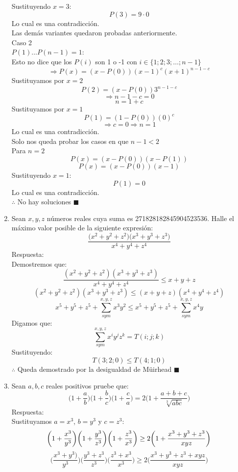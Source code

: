 \documentclass{book}
\begin{document}
\begin{enumerate}
        Sustituyendo $x=3$:
        $$P(3)=9\cdot 0$$
        Lo cual es una contradicción.\\
        Las demás variantes quedaron probadas anteriormente.\\
        Caso 2\\ $P(1)\ldots P(n-1)=1$:\\
        Esto no dice que los $P(i)$ son 1 o -1 con $i\in\{1;2;3;\ldots;n-1\}$
        $$\Rightarrow P(x)=(x-P(0)){(x-1)}^c{(x+1)}^{n-1-c}$$
        Sustituyamos por $x=2$
        $$P(2)=(x-P(0)){3}^{n-1-c}$$
        $$\Rightarrow n-1-c=0$$
        $$n=1+c$$
        Sustituyamos por $x=1$
        $$P(1)=(1-P(0)){(0)}^c$$
        $$\Rightarrow c=0\Rightarrow n=1$$
        Lo cual es una contradicción.\\
        Solo nos queda probar los casos en que $n-1<2$\\
        Para $n=2$
        $$P(x)=(x-P(0))(x-P(1))$$
        $$P(x)=(x-P(0))(x-1)$$
        Sustituyendo $x=1$:
        $$P(1)=0$$
        Lo cual es una contradicción.\\
        $\therefore$ No hay soluciones $\blacksquare$\\
        \item Sean $x,y,z$ números reales cuya suma es 271828182845904523536. Halle el máximo valor posible de la siguiente expresión:
        $$\frac{\big(x^2+y^2+z^2\big)\big(x^3+y^3+z^3\big)}{x^4+y^4+z^4}$$
        Respuesta:\\
        Demostremos que:
        $$\frac{(x^2+y^2+z^2 )(x^3+y^3+z^3 )}{x^4+y^4+z^4 }\leq x+y+z$$
        $$(x^2+y^2+z^2 )(x^3+y^3+z^3 )\leq(x+y+z)(x^4+y^4+z^4 )$$
        $$x^5+y^5+z^5+\sum_{sym}^{x,y,z}x^3 y^2\leq x^5+y^5+z^5+\sum_{sym}^{x,y,z}x^4 y$$
        Digamos que:
        $$\sum_{sym}^{x,y,z}x^i y^j z^k =T(i; j; k)$$
        Sustituyendo:
        $$T(3; 2; 0)\leq T(4;1;0)$$
        $\therefore$ Queda demostrado por la desigualdad de Müirhead $\blacksquare$\\
        \item Sean $a,b,c$ reales positivos pruebe que:
        $$\bigg(1+\frac{a}{b}\bigg)\bigg(1+\frac{b}{c}\bigg)\bigg(1+\frac{c}{a}\bigg)=2\bigg(1+\frac{a+b+c}{\sqrt[3]{abc}}\bigg)$$
        Respuesta:\\
        Sustituyamos $a=x^3$, $b=y^3$ y $c=z^3$:
        $$\bigg(1+{x^3\over y^3} \bigg)\bigg(1+{y^3\over z^3} \bigg)\bigg(1+{z^3\over x^3} \bigg)\geq 2\bigg(1+\frac{x^3+y^3+z^3}{xyz}\bigg)$$
        $$\bigg(\frac{x^3+y^3)}{y^3} \bigg)\bigg(\frac{y^3+z^3}{z^3} \bigg)\bigg(\frac{z^3+x^3}{x^3} \bigg)\geq 2\bigg(\frac{x^3+y^3+z^3+xyz}{xyz}\bigg)$$

\end{enumerate}
\end{document}

